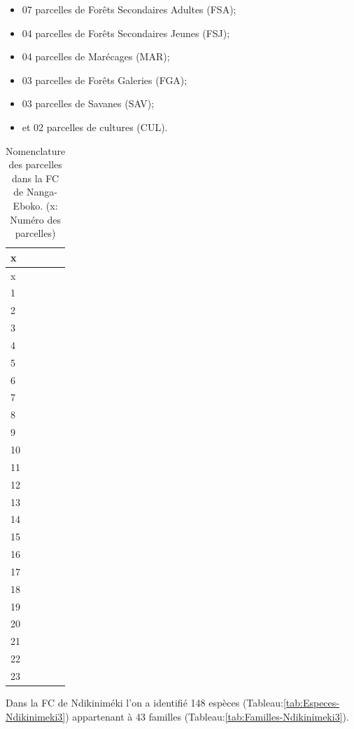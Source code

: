 \documentclass[
  12pt,
  a4paper,
  extrafontsizes,
  onecolumn,
  openright]{book}
\providecommand{\tightlist}{%
  \setlength{\itemsep}{0pt}\setlength{\parskip}{0pt}}
\theoremstyle{definition}
\theoremstyle{definition}
\theoremstyle{definition}
\theoremstyle{definition}
\theoremstyle{remark}
\begin{document}
\begin{itemize}
\tightlist
\item
  07 parcelles de Forêts Secondaires Adultes (FSA);
\item
  04 parcelles de Forêts Secondaires Jeunes (FSJ);
\item
  04 parcelles de Marécages (MAR);
\item
  03 parcelles de Forêts Galeries (FGA);
\item
  03 parcelles de Savanes (SAV);
\item
  et 02 parcelles de cultures (CUL).
\end{itemize}

\begin{longtable}[]{@{}l@{}}
\caption{\label{tab:NomenclatureparcellesNanga-Eboko3}Nomenclature des parcelles dans la FC de Nanga-Eboko. (x: Numéro des parcelles)}\tabularnewline
\toprule()
x \\
\midrule()
\endfirsthead
\toprule()
x \\
\midrule()
\endhead
1 \\
2 \\
3 \\
4 \\
5 \\
6 \\
7 \\
8 \\
9 \\
10 \\
11 \\
12 \\
13 \\
14 \\
15 \\
16 \\
17 \\
18 \\
19 \\
20 \\
21 \\
22 \\
23 \\
\bottomrule()
\end{longtable}

Dans la FC de Ndikiniméki l'on a identifié 148 espèces (Tableau:\ref{tab:Especes-Ndikinimeki3}) appartenant à 43 familles (Tableau:\ref{tab:Familles-Ndikinimeki3}).
\end{document}

